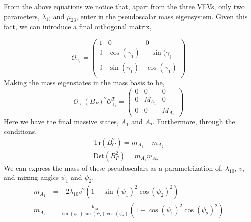 %
From the above equations we notice that, apart from the three VEVs, only two parameters, $\lambda_{10}$ and $\mu_{23}$, enter in the pseudoscalar mass eigensystem. Given this fact, we can introduce a final orthogonal matrix,
%

%
%
\begin{equation}
\mathcal{O}_{\gamma_1} = \begin{pmatrix}
1 & 0 & 0 \\
0 & \cos(\gamma_1) & -\sin(\gamma_) \\ 
0 & \sin(\gamma_1) & \cos(\gamma_1) \\
\end{pmatrix}
\end{equation}
Making the mass eigenstates in the mass basis to be, 
\begin{equation}
\mathcal{O}_{\gamma_1} \left( B_P \right)^2 \mathcal{O}_{\gamma_1}^T   = \begin{pmatrix}
0 & 0 & 0 \\ 
0 & M_{A_1} & 0 \\ 
0 & 0 & M_{A_2}
\end{pmatrix} 
\end{equation}
Here we have the final massive states,  $A_1$ and $A_2$. Furthermore, through the conditions, 
\begin{equation}
\begin{gathered}
\mathrm{Tr}(B_C^2) = m_{A_1} + m_{A_2}  \\
\mathrm{Det}( B_P^2 ) =  m_{A_1}  m_{A_2}
\end{gathered}
\end{equation} 
We can express the mass of these pseudoscalars as a parametrization of, $\lambda_{10}$, $v$, and mixing angles $\psi_1$ and $\psi_2$. 
\begin{equation}
\begin{split}
m_{A_1} & = - 2 \lambda_{10} v^2 \left( 1 - \sin(\psi_1)^2 \cos(\psi_2)^2 \right) \\ 
m_{A_2} & = \frac{\mu_23}{\sin(\psi_1)\sin(\psi_2)\cos(\psi_2)} \left( 1 - \cos(\psi_1)^2 \cos(\psi_2)^2 \right)
\end{split} 
\end{equation} 

